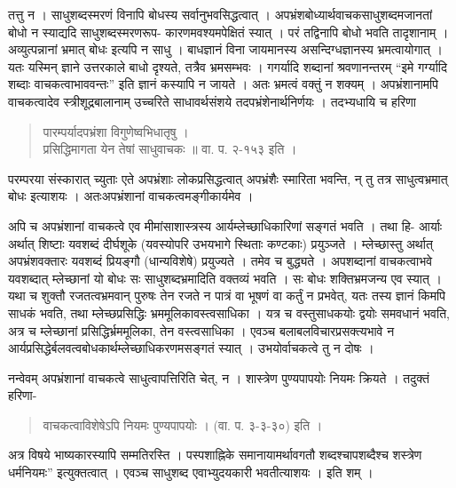 तत्तु न । साधुशब्दस्मरणं विनापि बोधस्य सर्वानुभवसिद्धत्वात् । अपभ्रंशबोध्यार्थवाचकसाधुशब्दमजानतां बोधो न स्याद्यदि साधुशब्दस्मरणरूप- कारणमवश्यमपेक्षितं स्यात् । परं तद्विनापि बोधो भवति तादृशानाम् । अव्युत्पन्नानां भ्रमात् बोधः इत्यपि न साधु । बाधज्ञानं विना जायमानस्य असन्दिग्धज्ञानस्य भ्रमत्वायोगात् । यतः यस्मिन् ज्ञाने उत्तरकाले बाधो दृश्यते, तत्रैव भ्रमसम्भवः । गगर्यादि शब्दानां श्रवणानन्तरम् “इमे गर्ग्यादि शब्दाः वाचकत्वाभाववन्तः” इति ज्ञानं कस्यापि न जायते । अतः भ्रमत्वं वक्तुं न शक्यम् । अपभ्रंशानामपि वाचकत्वादेव स्त्रीशूद्रबालानाम् उच्चरिते साधावर्थसंशये तदपभ्रंशेनार्थनिर्णयः । तदभ्यधायि च हरिणा 
\begin{verse}
पारम्पर्यादपभ्रंशा विगुणेष्वभिधातृषु । \\
प्रसिद्धिमागता येन तेषां साधुवाचकः ॥ वा. प. २-१५३ इति ।
\end{verse}
परम्परया संस्कारात् च्युताः एते अपभ्रंशाः लोकप्रसिद्धत्वात्  अपभ्रंशैः स्मारिता भवन्ति, न् तु तत्र साधुत्वभ्रमात् बोधः इत्याशयः । अतःअपभ्रंशानां वाचकत्वमङ्गीकार्यमेव ।

अपि च अपभ्रंशानां वाचकत्वे एव मीमांसाशास्त्रस्य आर्यम्लेच्छाधिकारिणां सङ्गतं भवति । तथा हि- आर्याः अर्थात् शिष्टाः यवशब्दं दीर्घशूके (यवस्योपरि उभयभागे स्थिताः कण्टकाः) प्रयुञ्जते । म्लेच्छास्तु अर्थात् अपभ्रंशवक्तारः यवशब्दं प्रियङ्गौ (धान्यविशेषे) प्रयुज्यते । तमेव च बुद्ध्यते । अपशब्दानां वाचकत्वाभवे यवशब्दात् म्लेच्छानां यो बोधः सः साधुशब्दभ्रमादिति वक्तव्यं भवति । सः बोधः शक्तिभ्रमजन्य एव स्यात् । यथा च शुक्तौ रजतत्वभ्रमवान् पुरुषः तेन रजते न पात्रं वा भूषणं वा कर्तुं न प्रभवेत्, यतः तस्य ज्ञानं किमपि साधकं भवति, तथा म्लेच्छप्रसिद्धिः भ्रममूलिकावस्त्वसाधिका । यत्र च वस्तुसाधकयोः द्वयोः समवधानं भवति, अत्र च म्लेच्छानां प्रसिद्धिर्भ्रममूलिका, तेन वस्त्वसाधिका । एवञ्च बलाबलविचारप्रसक्त्यभावे न आर्यप्रसिद्धेर्बलवत्वबोधकार्थम्लेच्छाधिकरणमसङ्गतं स्यात् । उभयोर्वाचकत्वे तु न दोषः ।

नन्वेवम् अपभ्रंशानां वाचकत्वे साधुत्वापत्तिरिति चेत्, न । शास्त्रेण पुण्यपापयोः नियमः क्रियते । तदुक्तं हरिणा-
\begin{verse}
वाचकत्वाविशेषेऽपि नियमः पुण्यपापयोः । (वा. प. ३-३-३०) इति । 
\end{verse}
अत्र विषये भाष्यकारस्यापि सम्मतिरस्ति । पस्पशाह्निके समानायामर्थावगतौ शब्दश्चापशब्दैश्च शस्त्रेण धर्मनियमः” इत्युक्तत्वात् । एवञ्च साधुशब्द एवाभ्युदयकारी भवतीत्याशयः । इति शम् ।
